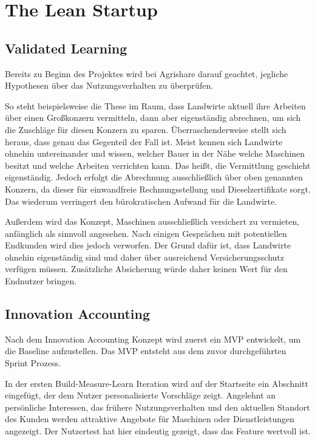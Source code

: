 \section{The Lean Startup}
\subsection*{Validated Learning}
Bereits zu Beginn des Projektes wird bei Agrishare darauf geachtet, jegliche Hypothesen über das Nutzungsverhalten zu überprüfen. 

So steht beispielsweise die These im Raum, dass Landwirte aktuell ihre Arbeiten über einen Großkonzern vermitteln, dann aber eigenständig abrechnen, um sich die Zuschläge für diesen Konzern zu sparen. Überraschenderweise stellt sich heraus, dass genau das Gegenteil der Fall ist. Meist kennen sich Landwirte ohnehin untereinander und wissen, welcher Bauer in der Nähe welche Maschinen besitzt und welche Arbeiten verrichten kann. Das heißt, die Vermittlung geschieht eigenständig. Jedoch erfolgt die Abrechnung ausschließlich über oben genannten Konzern, da dieser für einwandfreie Rechnungsstellung und Dieselzertifikate sorgt. Das wiederum verringert den bürokratischen Aufwand für die Landwirte.

Außerdem wird das Konzept, Maschinen ausschließlich versichert zu vermieten, anfänglich als sinnvoll angesehen. Nach einigen Gesprächen mit potentiellen Endkunden wird dies jedoch verworfen. Der Grund dafür ist, dass Landwirte ohnehin eigenständig sind und daher über ausreichend Versicherungsschutz verfügen müssen. Zusätzliche Absicherung würde daher keinen Wert für den Endnutzer bringen.

\subsection*{Innovation Accounting}
Nach dem Innovation Accounting Konzept wird zuerst ein MVP entwickelt, um die Baseline aufzustellen. Das MVP entsteht aus dem zuvor durchgeführten Sprint Prozess.

In der ersten Build-Measure-Learn Iteration wird auf der Startseite ein Abschnitt eingefügt, der dem Nutzer personalisierte Vorschläge zeigt. Angelehnt an persönliche Interessen, das frühere Nutzungsverhalten und den aktuellen Standort des Kunden werden attraktive Angebote für Maschinen oder Dienstleistungen angezeigt. Der Nutzertest hat hier eindeutig gezeigt, dass das Feature wertvoll ist. 

